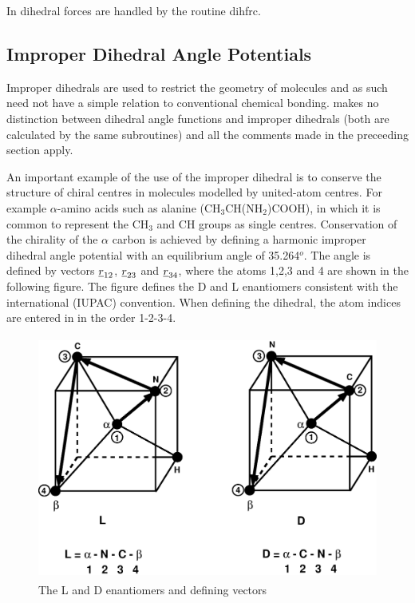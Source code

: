 In \D{} dihedral forces are handled by the routine {\sc dihfrc}.

\subsection{Improper Dihedral Angle Potentials}

Improper dihedrals are used to restrict the geometry of molecules and
as such need not have a simple relation to conventional chemical
bonding.  \D{} makes no distinction between dihedral angle
functions and improper dihedrals (both are calculated by the same
subroutines) and all the comments made in the preceeding section
apply.

An important example of the use of the improper
dihedral is to
conserve the structure of chiral centres in molecules modelled by
united-atom centres. For example $\alpha$-amino acids such as alanine
(CH$_{3}$CH(NH$_{2}$)COOH), in which it is common to represent the
CH$_{3}$ and CH groups as single centres. Conservation of the
chirality of the $\alpha$ carbon is achieved by defining a harmonic
improper dihedral angle potential with an equilibrium angle of
35.264$^{o}$.  The angle is defined by vectors $\mbox{$\underline{r}$}_{12}$,
$\mbox{$\underline{r}$}_{23}$ and $\mbox{$\underline{r}$}_{34}$, where the atoms 1,2,3 and 4 are
shown in the following figure. The figure defines the D and L
enantiomers consistent with the international (IUPAC) convention. When
defining the dihedral, the atom indices are entered in \D{}
in the order 1-2-3-4.

\begin{figure}[ht]
\begin{center}
\includegraphics[height=8cm]{isomers.eps}
\caption{The L and D enantiomers and defining vectors}
\end{center}
\end{figure}

